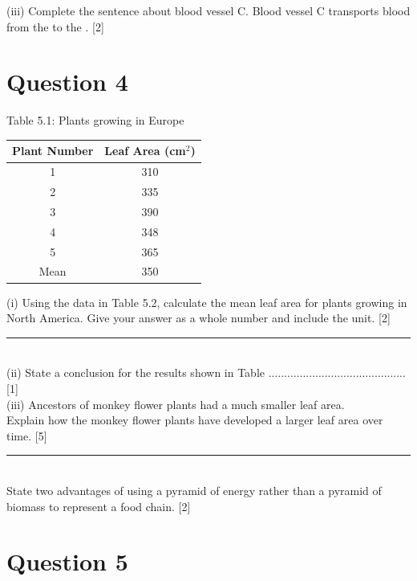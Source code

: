 \documentclass[12pt]{article}
\begin{document}
(iii) Complete the sentence about blood vessel C. Blood vessel C transports blood from the \underline{\hspace{5cm}} to the \underline{\hspace{5cm}}. \hfill [2] \\[2em]

\section*{Question 4}

Table 5.1: Plants growing in Europe

\begin{center}
\begin{tabular}{cc}
\toprule
Plant Number & Leaf Area (cm$^2$) \\
\midrule
1 & 310 \\
2 & 335 \\
3 & 390 \\
4 & 348 \\
5 & 365 \\
\midrule
Mean & 350 \\
\bottomrule
\end{tabular}
\end{center}

(i) Using the data in Table 5.2, calculate the mean leaf area for plants growing in North America. Give your answer as a whole number and include the unit. \hfill [2] \\
\noindent\rule{12cm}{0.4pt} \\[3em]

(ii) State a conclusion for the results shown in Table  ............................................ \hfill [1] \\

(iii) Ancestors of monkey flower plants had a much smaller leaf area. \\
Explain how the monkey flower plants have developed a larger leaf area over time. \hfill [5] \\
\noindent\rule{15cm}{0.4pt} \\[3em]

State two advantages of using a pyramid of energy rather than a pyramid of biomass to represent a food chain. \hfill [2] \\

\section*{Question 5}
\end{document}
